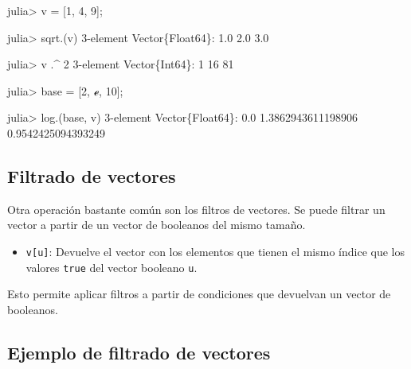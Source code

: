 \documentclass[
  letterpaper,
  DIV=11,
  numbers=noendperiod]{scrreprt}
\newenvironment{Shaded}{\begin{snugshade}}{\end{snugshade}}
\newcommand{\ConstantTok}[1]{\textcolor[rgb]{0.56,0.35,0.01}{#1}}
\newcommand{\DataTypeTok}[1]{\textcolor[rgb]{0.68,0.00,0.00}{#1}}
\newcommand{\FloatTok}[1]{\textcolor[rgb]{0.68,0.00,0.00}{#1}}
\newcommand{\FunctionTok}[1]{\textcolor[rgb]{0.28,0.35,0.67}{#1}}
\newcommand{\NormalTok}[1]{\textcolor[rgb]{0.00,0.23,0.31}{#1}}
\newcommand{\OperatorTok}[1]{\textcolor[rgb]{0.37,0.37,0.37}{#1}}
\providecommand{\tightlist}{%
  \setlength{\itemsep}{0pt}\setlength{\parskip}{0pt}}\usepackage{longtable,booktabs,array}
\begin{document}
\begin{Shaded}
\begin{Highlighting}[]
\NormalTok{julia}\OperatorTok{\textgreater{}}\NormalTok{ v }\OperatorTok{=}\NormalTok{ [}\FloatTok{1}\NormalTok{, }\FloatTok{4}\NormalTok{, }\FloatTok{9}\NormalTok{];}

\NormalTok{julia}\OperatorTok{\textgreater{}} \FunctionTok{sqrt}\NormalTok{.(v)}
\FloatTok{3}\OperatorTok{{-}}\NormalTok{element }\DataTypeTok{Vector}\NormalTok{\{}\DataTypeTok{Float64}\NormalTok{\}}\OperatorTok{:}
 \FloatTok{1.0}
 \FloatTok{2.0}
 \FloatTok{3.0}

\NormalTok{julia}\OperatorTok{\textgreater{}}\NormalTok{ v }\OperatorTok{.\^{}} \FloatTok{2}
\FloatTok{3}\OperatorTok{{-}}\NormalTok{element }\DataTypeTok{Vector}\NormalTok{\{}\DataTypeTok{Int64}\NormalTok{\}}\OperatorTok{:}
  \FloatTok{1}
 \FloatTok{16}
 \FloatTok{81}

\NormalTok{julia}\OperatorTok{\textgreater{}}\NormalTok{ base }\OperatorTok{=}\NormalTok{ [}\FloatTok{2}\NormalTok{, }\ConstantTok{ℯ}\NormalTok{, }\FloatTok{10}\NormalTok{];}

\NormalTok{julia}\OperatorTok{\textgreater{}} \FunctionTok{log}\NormalTok{.(base, v)}
\FloatTok{3}\OperatorTok{{-}}\NormalTok{element }\DataTypeTok{Vector}\NormalTok{\{}\DataTypeTok{Float64}\NormalTok{\}}\OperatorTok{:}
 \FloatTok{0.0}
 \FloatTok{1.3862943611198906}
 \FloatTok{0.9542425094393249}
\end{Highlighting}
\end{Shaded}

\hypertarget{filtrado-de-vectores}{%
\subsection{Filtrado de vectores}\label{filtrado-de-vectores}}

Otra operación bastante común son los filtros de vectores. Se puede
filtrar un vector a partir de un vector de booleanos del mismo tamaño.

\begin{itemize}
\tightlist
\item
  \texttt{v{[}u{]}}: Devuelve el vector con los elementos que tienen el
  mismo índice que los valores \texttt{true} del vector booleano
  \texttt{u}.
\end{itemize}

Esto permite aplicar filtros a partir de condiciones que devuelvan un
vector de booleanos.

\hypertarget{ejemplo-de-filtrado-de-vectores}{%
\subsection{Ejemplo de filtrado de
vectores}\label{ejemplo-de-filtrado-de-vectores}}
\end{document}
